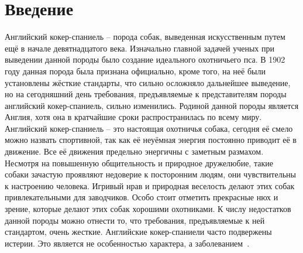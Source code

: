 \section*{Введение}
\label{introduction}

Английский кокер-спаниель -- порода собак, выведенная искусственным путем ещё в начале девятнадцатого века. Изначально главной задачей ученых при выведении данной породы было создание идеального охотничьего пса. В 1902 году данная порода была признана официально, кроме того, на неё были установлены жёсткие стандарты, что сильно осложняло дальнейшее выведение, но на сегодняшний день требования, предъявляемые к представителям породы английский кокер-спаниель, сильно изменились. Родиной данной породы является Англия, хотя она в кратчайшие сроки распространилась по всему миру.\\

Английский кокер-спаниель -- это настоящая охотничья собака, сегодня её смело можно назвать спортивной, так как её неуёмная энергия постоянно приводит её в движение. Все её движения предельно энергичны с заметным размахом. Несмотря на повышенную общительность и природное дружелюбие, такие собаки зачастую проявляют недоверие к посторонним людям, они чувствительны к настроению человека. Игривый нрав и природная веселость делают этих собак привлекательными для заводчиков. Особо стоит отметить прекрасные нюх и зрение, которые делают этих собак хорошими охотниками. К числу недостатков данной породы можно отнести то, что требования, предъявляемые к ней стандартом, очень жесткие. Английские кокер-спаниели часто подвержены истерии. Это является не особенностью характера, а заболеванием~\cite{wiki:aks}.